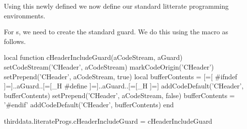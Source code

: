 Using this newly defined  we now define our standard
litterate programming environments.

\startMkIVCode
{}







\setLitProgsOriginMarker[MkIVCode][markMkIVCodeOrigin]
\setLitProgsOriginMarker[MpIVCode][markMpIVCodeOrigin]
\setLitProgsOriginMarker[LuaCode][markLuaCodeOrigin]
\setLitProgsOriginMarker[LuaTemplate][markLuaTemplateOrigin]
\setLitProgsOriginMarker[CHeader][markCHeaderOrigin]
\setLitProgsOriginMarker[CCode][markCCodeOrigin]
\stopMkIVCode

For s, we need to create the standard  guard.
We do this using the \type{\CHeaderIncludeGuard} macro as follows.

\startMkIVCode
\def\CHeaderIncludeGuard#1#2{
  \directlua{
    thirddata.literateProgs.cHeaderIncludeGuard('#1', '#2')
  }
}
\stopMkIVCode

\startLuaCode
local function cHeaderIncludeGuard(aCodeStream, aGuard)
  setCodeStream('CHeader', aCodeStream)
  markCodeOrigin('CHeader')
  setPrepend('CHeader', aCodeStream, true)
  local bufferContents = [=[
#ifndef ]=]..aGuard..[=[_H
#define ]=]..aGuard..[=[_H
]=]
  addCodeDefault('CHeader', bufferContents)
  setPrepend('CHeader', aCodeStream, false)
  bufferContents = '#endif'
  addCodeDefault('CHeader', bufferContents)
end

thirddata.literateProgs.cHeaderIncludeGuard = cHeaderIncludeGuard
\stopLuaCode

